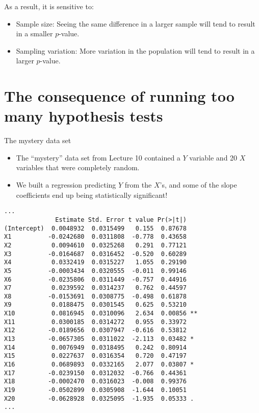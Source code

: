 \documentclass{beamer}\usepackage[]{graphicx}\usepackage[]{color}
\makeatletter
\newenvironment{kframe}{%
 \def\at@end@of@kframe{}%
 \ifinner\ifhmode%
  \def\at@end@of@kframe{\end{minipage}}%
  \begin{minipage}{\columnwidth}%
 \fi\fi%
 \def\FrameCommand##1{\hskip\@totalleftmargin \hskip-\fboxsep
 \colorbox{shadecolor}{##1}\hskip-\fboxsep
     \hskip-\linewidth \hskip-\@totalleftmargin \hskip\columnwidth}%
 \MakeFramed {\advance\hsize-\width
   \@totalleftmargin\z@ \linewidth\hsize
   \@setminipage}}%
 {\par\unskip\endMakeFramed%
 \at@end@of@kframe}
\newenvironment{knitrout}{}{} %
\makeatother
\begin{document}
\begin{darkframes}
\begin{frame}
      \bigskip

      As a result, it is sensitive to:
      \begin{itemize}
        \item \alert{Sample size}: Seeing the same difference in a larger sample will tend to result in a smaller $p$-value.
        \item \alert{Sampling variation}: More variation in the population will tend to result in a larger $p$-value.
      \end{itemize}
    \end{frame}

    \section{The consequence of running too many hypothesis tests}

    \begin{frame}{The mystery data set}
      \begin{itemize}
        \item The ``mystery'' data set from Lecture 10 contained a $Y$ variable and 20 $X$ variables that were \alert{completely random}.
        \item We built a regression predicting $Y$ from the $X$'s, and some of the slope coefficients end up being statistically significant!
      \end{itemize}
    \end{frame}

    \begin{frame}[fragile]
      \fontvsm
\begin{knitrout}
\begin{kframe}
\begin{verbatim}
...
              Estimate Std. Error t value Pr(>|t|)   
(Intercept)  0.0048932  0.0315499   0.155  0.87678   
X1          -0.0242680  0.0311808  -0.778  0.43658   
X2           0.0094610  0.0325268   0.291  0.77121   
X3          -0.0164687  0.0316452  -0.520  0.60289   
X4           0.0332419  0.0315227   1.055  0.29190   
X5          -0.0003434  0.0320555  -0.011  0.99146   
X6          -0.0235806  0.0311449  -0.757  0.44916   
X7           0.0239592  0.0314237   0.762  0.44597   
X8          -0.0153691  0.0308775  -0.498  0.61878   
X9           0.0188475  0.0301545   0.625  0.53210   
X10          0.0816945  0.0310096   2.634  0.00856 **
X11          0.0300185  0.0314272   0.955  0.33972   
X12         -0.0189656  0.0307947  -0.616  0.53812   
X13         -0.0657305  0.0311022  -2.113  0.03482 * 
X14          0.0076949  0.0318495   0.242  0.80914   
X15          0.0227637  0.0316354   0.720  0.47197   
X16          0.0689893  0.0332165   2.077  0.03807 * 
X17         -0.0239150  0.0312032  -0.766  0.44361   
X18         -0.0002470  0.0316023  -0.008  0.99376   
X19         -0.0502899  0.0305908  -1.644  0.10051   
X20         -0.0628928  0.0325095  -1.935  0.05333 . 
...


\end{verbatim}
\end{kframe}
\end{knitrout}
\end{frame}
\end{darkframes}
\end{document}
